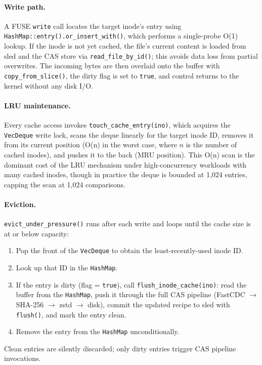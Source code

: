 \documentclass[journal]{IEEEtran}
\begin{document}
\paragraph{Write path.}
A FUSE \texttt{write} call locates the target inode's entry using
\texttt{HashMap::entry().or\_insert\_with()}, which performs a single-probe
O(1) lookup.  If the inode is not yet cached, the file's current content
is loaded from sled and the CAS store via \texttt{read\_file\_by\_id()};
this avoids data loss from partial overwrites.  The incoming bytes are
then overlaid onto the buffer with \texttt{copy\_from\_slice()}, the dirty
flag is set to \texttt{true}, and control returns to the kernel without
any disk I/O.

\paragraph{LRU maintenance.}
Every cache access invokes \texttt{touch\_cache\_entry(ino)}, which
acquires the \texttt{VecDeque} write lock, scans the deque linearly
for the target inode ID, removes it from its current position (O(n) in
the worst case, where $n$ is the number of cached inodes), and pushes it
to the back (MRU position).  This O(n) scan is the dominant cost of the
LRU mechanism under high-concurrency workloads with many cached inodes,
though in practice the deque is bounded at 1,024 entries, capping the
scan at 1,024 comparisons.

\paragraph{Eviction.}
\texttt{evict\_under\_pressure()} runs after each write and loops until
the cache size is at or below capacity:
\begin{enumerate}
\item Pop the front of the \texttt{VecDeque} to obtain the
  least-recently-used inode ID.
\item Look up that ID in the \texttt{HashMap}.
\item If the entry is dirty (flag = \texttt{true}), call
  \texttt{flush\_inode\_cache(ino)}: read the buffer from the
  \texttt{HashMap}, push it through the full CAS pipeline
  (FastCDC $\to$ SHA-256 $\to$ zstd $\to$ disk), commit the updated
  recipe to sled with \texttt{flush()}, and mark the entry clean.
\item Remove the entry from the \texttt{HashMap} unconditionally.
\end{enumerate}
Clean entries are silently discarded; only dirty entries trigger CAS
pipeline invocations.
\end{document}
